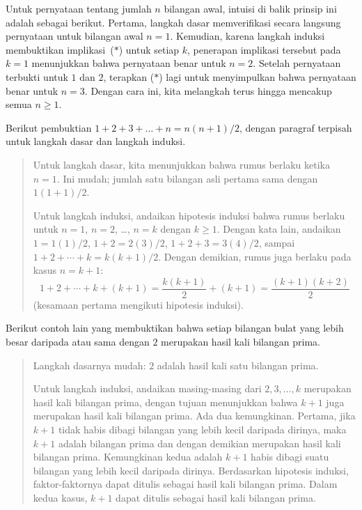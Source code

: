 Untuk pernyataan tentang jumlah $n$ bilangan awal, intuisi di balik prinsip
ini adalah sebagai berikut. Pertama, langkah dasar memverifikasi secara
langsung pernyataan untuk bilangan awal $n=1$. Kemudian, karena langkah
induksi membuktikan implikasi~($*$) untuk setiap $k$, penerapan implikasi
tersebut pada $k=1$ menunjukkan bahwa pernyataan benar untuk $n=2$.
Setelah pernyataan terbukti untuk $1$ dan $2$, terapkan ($*$) lagi untuk
menyimpulkan bahwa pernyataan benar untuk $n=3$.
Dengan cara ini, kita melangkah terus hingga mencakup semua $n\geq 1$.

Berikut pembuktian \( 1+2+3+\dots+n=n(n+1)/2 \), dengan paragraf terpisah
untuk langkah dasar dan langkah induksi.
\begin{quote}\small
Untuk langkah dasar, kita menunjukkan bahwa rumus berlaku ketika \( n=1 \).
Ini mudah; jumlah satu bilangan asli pertama sama dengan \( 1(1+1)/2 \).

Untuk langkah induksi, andaikan hipotesis induksi bahwa rumus berlaku untuk
\( n=1 \), \( n=2 \), \ldots, \( n=k \) dengan $k\geq 1$.
Dengan kata lain, andaikan
$1=1(1)/2$, $1+2=2(3)/2$, $1+2+3=3(4)/2$, sampai
$1+2+\cdots+k=k(k+1)/2$.
Dengan demikian, rumus juga berlaku pada kasus \( n=k+1 \):
\begin{equation*}
  1+2+\cdots+k+(k+1)
  =
  \frac{k(k+1)}{2}+(k+1)
  =
  \frac{(k+1)(k+2)}{2}
\end{equation*}
(kesamaan pertama mengikuti hipotesis induksi).
\end{quote}

Berikut contoh lain yang membuktikan bahwa setiap bilangan bulat yang lebih
besar daripada atau sama dengan \( 2 \) merupakan hasil kali bilangan prima.
\begin{quote}\small
Langkah dasarnya mudah: \( 2 \) adalah hasil kali satu bilangan prima.

Untuk langkah induksi, andaikan masing-masing dari \( 2,3,\ldots,k \)
merupakan hasil kali bilangan prima, dengan tujuan menunjukkan bahwa
\( k+1 \) juga merupakan hasil kali bilangan prima.
Ada dua kemungkinan.
Pertama, jika \( k+1 \) tidak habis dibagi bilangan yang lebih kecil daripada
dirinya, maka \( k+1 \) adalah bilangan prima dan dengan demikian merupakan
hasil kali bilangan prima.
Kemungkinan kedua adalah \( k+1 \) habis dibagi suatu bilangan yang lebih
kecil daripada dirinya. Berdasarkan hipotesis induksi, faktor-faktornya dapat
ditulis sebagai hasil kali bilangan prima.
Dalam kedua kasus, \( k+1 \) dapat ditulis sebagai hasil kali bilangan prima.
\end{quote}





